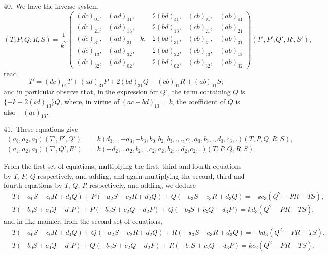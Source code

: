 \documentclass[11pt,a4paper]{book}
\begin{document}
\medskip

40.\ We have the inverse system
\[
(T, P, Q, R, S) = \frac{1}{k^2}
\begin{pmatrix}
(dc)_{01}, & (ad)_{31}, & 2(bd)_{31}, & (cb)_{01}, & (ab)_{01}\\
(dc)_{21}, & (ad)_{13}, & 2(bd)_{13}, & (cb)_{21}, & (ab)_{21}\\
(dc)_{31}, & (ad)_{31} - k, & 2(bd)_{31}, & (cb)_{31}, & (ab)_{31}\\
(dc)_{13}, & (ad)_{32}, & 2(bd)_{32}, & (cb)_{13}, & (ab)_{13}\\
(dc)_{32}, & (ad)_{02}, & 2(bd)_{02}, & (cb)_{32}, & (ab)_{32}
\end{pmatrix}
(T', P', Q', R', S'),
\]
read
\[
T' = (dc)_{01}T + (ad)_{31}P + 2(bd)_{31}Q + (cb)_{01}R + (ab)_{01}S;
\]
and in particular observe that, in the expression for $Q'$, the term containing $Q$ is $\{-k + 2(bd)_{13}\}Q$, where, in virtue of $(ac + bd)_{13} = k$, the coefficient of $Q$ is also $-(ac)_{13}$.

\medskip

41.\ These equations give
\begin{align*}
(a_0, a_2, a_3)(T', P', Q') &= k(d_3, ., -a_3, -b_3, b_0, b_2, b_3, ., ., c_3, a_3, b_3, ., d_3, c_3, .)(T, P, Q, R, S),\\
(a_1, a_2, a_3)(T', Q', R') &= k(-d_2, ., a_2, b_2, ., c_2, a_2, b_2, ., d_2, c_2, .)(T, P, Q, R, S).
\end{align*}

From the first set of equations, multiplying the first, third and fourth equations by $T$, $P$, $Q$ respectively, and adding, and again multiplying the second, third and fourth equations by $T$, $Q$, $R$ respectively, and adding, we deduce
\begin{align*}
&T(-a_0S - c_0R + d_0Q) + P(-a_2S - c_2R + d_2Q) + Q(-a_3S - c_3R + d_3Q) = -kc_3(Q^2 - PR - TS),\\
&T(-b_0S + c_0Q - d_0P) + P(-b_2S + c_2Q - d_2P) + Q(-b_3S + c_3Q - d_3P) = kd_3(Q^2 - PR - TS);
\end{align*}
and in like manner, from the second set of equations,
\begin{align*}
&T(-a_0S - c_0R + d_0Q) + Q(-a_2S - c_2R + d_2Q) + R(-a_3S - c_3R + d_3Q) = -kd_3(Q^2 - PR - TS),\\
&T(-b_0S + c_0Q - d_0P) + Q(-b_2S + c_2Q - d_2P) + R(-b_3S + c_3Q - d_3P) = kc_2(Q^2 - PR - TS).
\end{align*}

\medskip
\end{document}
